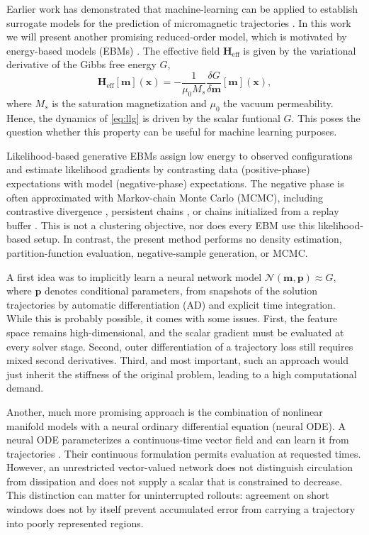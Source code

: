 \documentclass[a4paper,11pt]{article}
\newcommand{\m}{\bm m}
\newcommand{\p}{\bm p}
\begin{document}
Earlier work has demonstrated that machine-learning can be applied to establish surrogate models for the prediction of micromagnetic trajectories \cite{exl2021prediction, schaffer2021machine, kovacs2019learning}. In this work we will present another promising reduced-order model, which is motivated by energy-based models (EBMs) \cite{du2019implicit}. The effective field $\bm H_{\mathrm{eff}}$ is given by the variational derivative of the Gibbs free energy $G$,
\begin{equation}
    \bm H_{\mathrm{eff}}[\m](\bm x)
    = -\frac{1}{\mu_0 M_s}
    \frac{\delta G}{\delta \m}[\m](\bm x),
    \label{eq:effective-field}
\end{equation}
where $M_s$ is the saturation magnetization and $\mu_0$ the vacuum permeability.
Hence, the dynamics of \eqref{eq:llg} is driven by the scalar funtional $G$. This poses the question whether this property can be useful for machine learning purposes.

Likelihood-based generative EBMs assign low energy to observed configurations and estimate likelihood gradients by contrasting data (positive-phase) expectations with model (negative-phase) expectations. The negative phase is often approximated with Markov-chain Monte Carlo (MCMC), including contrastive divergence \cite{hinton2002training}, persistent chains \cite{tieleman2008training}, or chains initialized from a replay buffer \cite{du2019implicit}. This is not a clustering objective, nor does every EBM use this likelihood-based setup. 
In contrast, the present method performs no density estimation, partition-function evaluation, negative-sample generation, or MCMC. 

A first idea was to implicitly learn a neural network model $\mathcal N(\m, \p)\approx G$, where $\p$ denotes conditional parameters, from snapshots of the solution trajectories by automatic differentiation (AD) and explicit time integration. While this is probably possible, it comes with some issues. First, the feature space remains high-dimensional, and the scalar gradient must be evaluated at every solver stage. Second, outer differentiation of a trajectory loss still requires mixed second derivatives. Third, and most important, such an approach would just inherit the stiffness of the original problem, leading to a high computational demand. 

Another, much more promising approach is the combination of nonlinear manifold models with a neural ordinary differential equation (neural ODE). A neural ODE parameterizes a continuous-time vector field and can learn it from trajectories \cite{chen2018neural,rubanova2019latent}. 
Their continuous formulation permits evaluation at requested times.
However, an unrestricted vector-valued network does not distinguish circulation from dissipation and does not supply a scalar that is constrained to decrease. This distinction can matter for uninterrupted rollouts: agreement on short windows does not by itself prevent accumulated error from carrying a trajectory into poorly represented regions.
\end{document}
